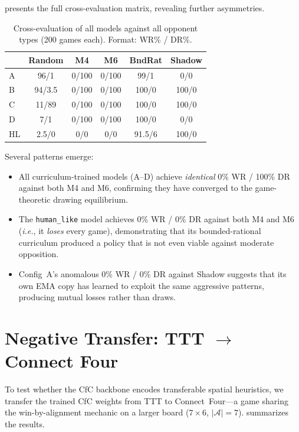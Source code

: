 \documentclass[conference]{IEEEtran}
\newcommand{\ie}{\textit{i.e.}}
\begin{document}
 presents the full cross-evaluation matrix, revealing further asymmetries.

\begin{table}[t]
\centering
\caption{Cross-evaluation of all models against all opponent types (200 games each). Format: WR\% / DR\%.}
\label{tab:cross}
\setlength{\tabcolsep}{2.5pt}
\footnotesize
\begin{tabular}{@{}l ccccc@{}}
\toprule
 & \textbf{Random} & \textbf{M4} & \textbf{M6} & \textbf{BndRat} & \textbf{Shadow} \\
\midrule
A & 96/1  & 0/100 & 0/100 & 99/1  & 0/0 \\
B & 94/3.5 & 0/100 & 0/100 & 100/0 & 100/0 \\
C & 11/89 & 0/100 & 0/100 & 100/0 & 100/0 \\
D & 7/1   & 0/100 & 0/100 & 100/0 & 0/0 \\
HL & 2.5/0 & 0/0   & 0/0   & 91.5/6 & 100/0 \\
\bottomrule
\end{tabular}
\end{table}

Several patterns emerge:
\begin{itemize}
    \item All curriculum-trained models (A--D) achieve \emph{identical} 0\% WR / 100\% DR against both M4 and M6, confirming they have converged to the game-theoretic drawing equilibrium.
    \item The \texttt{human\_like} model achieves 0\% WR / 0\% DR against both M4 and M6 (\ie, it \emph{loses} every game), demonstrating that its bounded-rational curriculum produced a policy that is not even viable against moderate opposition.
    \item Config~A's anomalous 0\% WR / 0\% DR against Shadow suggests that its own EMA copy has learned to exploit the same aggressive patterns, producing mutual losses rather than draws.
\end{itemize}

\section{Negative Transfer: TTT \texorpdfstring{$\to$}{->} Connect Four}
\label{sec:transfer}

To test whether the CfC backbone encodes transferable spatial heuristics, we transfer the trained CfC weights from TTT to Connect~Four---a game sharing the win-by-alignment mechanic on a larger board ($7 \times 6$, $|\mathcal{A}| = 7$).  summarizes the results.
\end{document}

